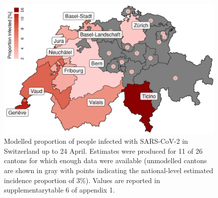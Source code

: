 \begin{figure}\centering
  \includegraphics[width=\textwidth]{fig_covid-switzerland-npi/FIGURE_5_mod.png}
  \caption[Modelled proportion of people infected with SARS-CoV-2 in Switzerland.]{Modelled proportion of people infected with SARS-CoV-2 in Switzerland up to 24 April. Estimates were produced for 11 of 26 cantons for which enough data were available (unmodelled cantons are shown in gray with points indicating the national-level estimated incidence proportion of 3\%). Values are reported in supplementarytable 6 of appendix 1.}
  \label{fig:covid-ch-map}
\end{figure}

